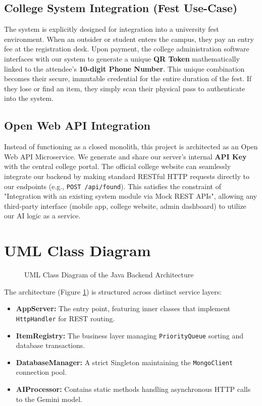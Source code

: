 \documentclass[12pt,a4paper]{article}
\begin{document}
\subsection{College System Integration (Fest Use-Case)}
The system is explicitly designed for integration into a university fest environment. When an outsider or student enters the campus, they pay an entry fee at the registration desk. Upon payment, the college administration software interfaces with our system to generate a unique \textbf{QR Token} mathematically linked to the attendee's \textbf{10-digit Phone Number}. This unique combination becomes their secure, immutable credential for the entire duration of the fest. If they lose or find an item, they simply scan their physical pass to authenticate into the system.

\subsection{Open Web API Integration}
Instead of functioning as a closed monolith, this project is architected as an Open Web API Microservice. We generate and share our server's internal \textbf{API Key} with the central college portal. The official college website can seamlessly integrate our backend by making standard RESTful HTTP requests directly to our endpoints (e.g., \texttt{POST /api/found}). This satisfies the constraint of "Integration with an existing system module via Mock REST APIs", allowing any third-party interface (mobile app, college website, admin dashboard) to utilize our AI logic as a service.

\section{UML Class Diagram}

\begin{figure}[h!]
    \centering
    \caption{UML Class Diagram of the Java Backend Architecture}
    \label{fig:uml_diagram}
\end{figure}

The architecture (Figure \ref{fig:uml_diagram}) is structured across distinct service layers:
\begin{itemize}
    \item \textbf{AppServer:} The entry point, featuring inner classes that implement \texttt{HttpHandler} for REST routing.
    \item \textbf{ItemRegistry:} The business layer managing \texttt{PriorityQueue} sorting and database transactions.
    \item \textbf{DatabaseManager:} A strict Singleton maintaining the \texttt{MongoClient} connection pool.
    \item \textbf{AIProcessor:} Contains static methods handling asynchronous HTTP calls to the Gemini model.
\end{itemize}
\end{document}
